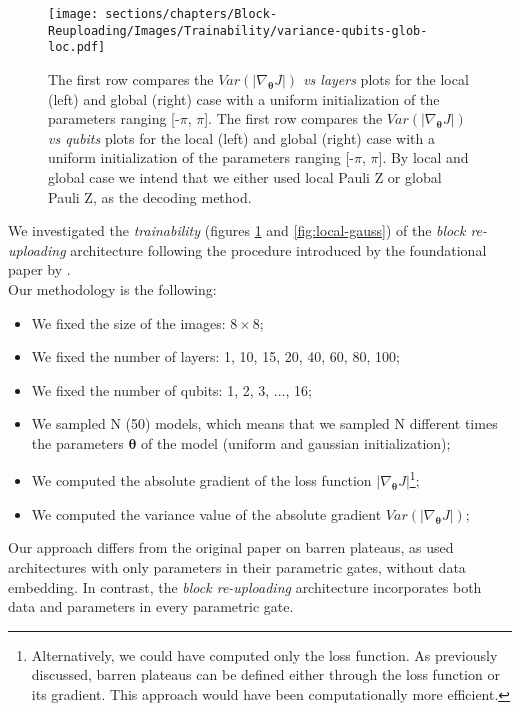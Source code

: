 \begin{figure}[h]
    \centering
    \texttt{[image: sections/chapters/Block-Reuploading/Images/Trainability/variance-qubits-glob-loc.pdf]}
    \caption{The first row compares the \textit{$Var(|\nabla_{\bm{\theta}}J|)$ vs layers} plots for the local (left)
    and global (right) case with a uniform initialization of the parameters ranging [-$\pi$, $\pi$].
    The first row compares the \textit{$Var(|\nabla_{\bm{\theta}}J|)$ vs qubits} plots for the local (left)
    and global (right) case with a uniform initialization of the parameters ranging [-$\pi$, $\pi$].
    By local and global case we intend that we either used local Pauli Z or global Pauli Z, as the 
    decoding method.}
    \label{fig:uniform-init}
\end{figure}

We investigated the \textit{trainability} (figures \ref{fig:uniform-init} and \ref{fig:local-gauss}) 
of the \textit{block re-uploading} architecture following the procedure introduced by 
the foundational paper by \cite{McClean_2018}.\\
Our methodology is the following:

\begin{itemize}
    \item We fixed the size of the images: $8\times8$;
    \item We fixed the number of layers: 1, 10, 15, 20, 40, 60, 80, 100;
    \item We fixed the number of qubits: 1, 2, 3, ..., 16;
    \item We sampled N (50) models, which means that we sampled N different times the parameters 
    $\bm{\theta}$ of the model (uniform and gaussian initialization);
    \item We computed the absolute gradient of the loss function $|\nabla_{\bm{\theta}}J|$\footnote[1]{
        Alternatively, we could have computed only the loss function. As previously discussed, 
        barren plateaus can be defined either through the loss function or its gradient. 
        This approach would have been computationally more efficient.
    };
    \item We computed the variance value of the absolute gradient $Var(|\nabla_{\bm{\theta}}J|)$;
\end{itemize}

Our approach differs from the original paper on barren plateaus, as \cite{McClean_2018} 
used architectures with only parameters in their parametric gates, without data embedding. 
In contrast, the \textit{block re-uploading} architecture incorporates both data and parameters 
in every parametric gate.\\


